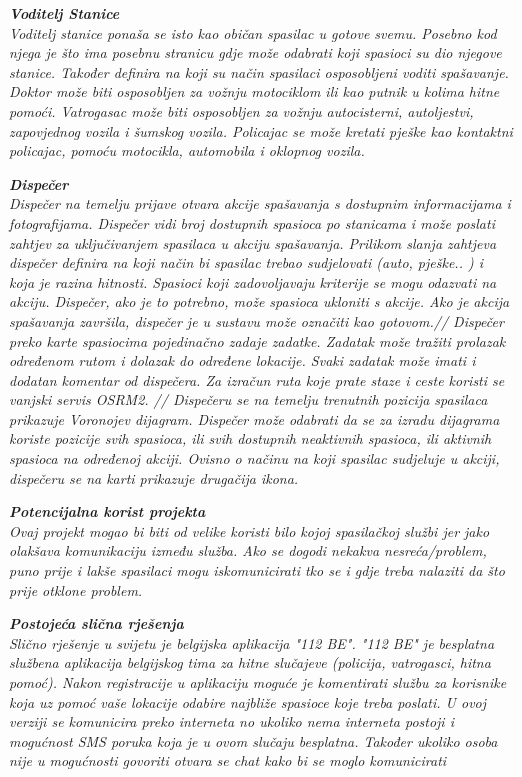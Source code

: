 		\textbf{\textit{Voditelj Stanice}}\\
		\textit{Voditelj stanice ponaša se isto kao običan spasilac u gotove svemu. Posebno kod njega je što ima posebnu stranicu gdje može odabrati koji spasioci su dio njegove stanice. Također definira na koji su način spasilaci osposobljeni voditi spašavanje. Doktor može biti osposobljen za vožnju motociklom ili kao putnik u kolima hitne pomoći. Vatrogasac može biti osposobljen za vožnju autocisterni, autoljestvi, zapovjednog vozila i šumskog vozila. Policajac se može kretati pješke kao kontaktni policajac, pomoću motocikla, automobila i oklopnog vozila.}
		
		\textbf{\textit{Dispečer}}\\
		\textit{Dispečer na temelju prijave otvara akcije spašavanja s dostupnim informacijama i fotografijama. Dispečer vidi broj dostupnih spasioca po stanicama i može poslati zahtjev za uključivanjem spasilaca u akciju spašavanja. Prilikom slanja zahtjeva dispečer definira na koji način bi spasilac trebao sudjelovati (auto, pješke.. ) i koja je razina hitnosti. Spasioci koji zadovoljavaju kriterije se mogu odazvati na akciju. Dispečer, ako je to potrebno, može spasioca ukloniti s akcije. Ako je akcija spašavanja završila, dispečer je u sustavu može označiti kao gotovom.//
		Dispečer preko karte spasiocima pojedinačno zadaje zadatke. Zadatak može tražiti prolazak određenom rutom i dolazak do određene lokacije. Svaki zadatak može imati i dodatan komentar od dispečera. Za izračun ruta koje prate staze i ceste koristi se vanjski servis OSRM2. //
		Dispečeru se na temelju trenutnih pozicija spasilaca prikazuje Voronojev dijagram. Dispečer može odabrati da se za izradu dijagrama koriste pozicije svih spasioca, ili svih dostupnih neaktivnih spasioca, ili aktivnih spasioca na određenoj akciji. Ovisno o načinu na koji spasilac sudjeluje u akciji, dispečeru se na karti prikazuje drugačija ikona.
		}
	
		\textbf{\textit{Potencijalna korist projekta}}\\
		\textit{Ovaj projekt mogao bi biti od velike koristi bilo kojoj spasilačkoj službi jer jako olakšava komunikaciju između služba. Ako se dogodi nekakva nesreća/problem, puno prije i lakše spasilaci mogu iskomunicirati tko se i gdje treba nalaziti da što prije otklone problem.}
		
		\textbf{\textit{Postojeća slična rješenja}}\\
		\textit{ Slično rješenje u svijetu je belgijska aplikacija "112 BE". "112 BE" je besplatna službena aplikacija belgijskog tima za hitne slučajeve (policija, vatrogasci, hitna pomoć). Nakon registracije u aplikaciju moguće je komentirati službu za korisnike koja uz pomoć vaše lokacije odabire najbliže spasioce koje treba poslati. U ovoj verziji se komunicira preko  interneta no ukoliko nema interneta postoji i mogućnost SMS poruka koja je u ovom slučaju besplatna. Također ukoliko osoba nije u mogućnosti govoriti otvara se chat kako bi se moglo komunicirati  }


